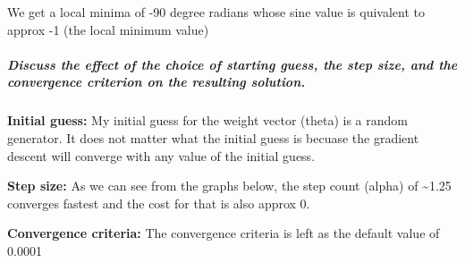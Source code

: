\documentclass[11pt]{article}
\begin{document}
    We get a local minima of -90 degree radians whose sine value is
quivalent to approx -1 (the local minimum value)

    \subparagraph{Discuss the effect of the choice of starting guess, the
step size, and the convergence criterion on the resulting
solution.}\label{discuss-the-effect-of-the-choice-of-starting-guess-the-step-size-and-the-convergence-criterion-on-the-resulting-solution.}

\textbf{Initial guess:} My initial guess for the weight vector (theta)
is a random generator. It does not matter what the initial guess is
becuase the gradient descent will converge with any value of the initial
guess.

\textbf{Step size:} As we can see from the graphs below, the step count
(alpha) of \textasciitilde{}1.25 converges fastest and the cost for that
is also approx 0.

\textbf{Convergence criteria:} The convergence criteria is left as the
default value of 0.0001
\end{document}
